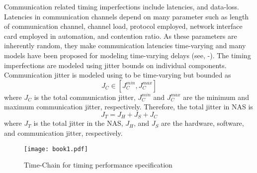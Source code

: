 \documentclass[letterpaper, 10 pt, conference]{ieeeconf}
\begin{document}
Communication related timing imperfections include latencies, and data-loss. Latencies in communication channels depend on many parameter such as length of communication channel, channel load, protocol employed, network interface card employed in automation, and contention ratio. As these parameters are inherently random, they make communication latencies time-varying and many models have been proposed for modeling time-varying delays (see, \cite{SeshThe}-\cite{Nilson}). The timing imperfections are modeled using jitter bounds on individual components. Communication jitter is modeled using to be time-varying but bounded as
\begin{equation}
J_C \in [J_C^{min}, J_C^{max}]
\label{eq:jitterCom}
\end{equation}
where $J_C$ is the total communication jitter, $J_C^{min}$ and $J_C^{max}$ are the minimum and maximum communication jitter, respectively. Therefore, the total jitter in NAS is
\begin{equation}
J_T =J_H+J_S+J_C
\label{eq:jitterCom}
\end{equation}
where $J_T$ is the total jitter in the NAS, $J_H$, and $J_S$ are the hardware, software, and communication jitter, respectively. 
\begin{figure}[h]
\centering
\texttt{[image: book1.pdf]}
\caption{Time-Chain for timing performance specification}
\label{fig:timechain}
\end{figure}
\end{document}
